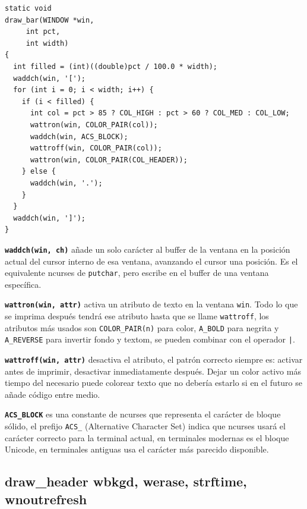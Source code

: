 \documentclass[12pt,letterpaper]{article}
\begin{document}
\begin{lstlisting}[style=modernc, caption={\texttt{ui.c} draw\_bar()}]
static void
draw_bar(WINDOW *win,
	 int pct,
	 int width)
{
  int filled = (int)((double)pct / 100.0 * width);
  waddch(win, '[');
  for (int i = 0; i < width; i++) {
    if (i < filled) {
      int col = pct > 85 ? COL_HIGH : pct > 60 ? COL_MED : COL_LOW;
      wattron(win, COLOR_PAIR(col));
      waddch(win, ACS_BLOCK);
      wattroff(win, COLOR_PAIR(col));
      wattron(win, COLOR_PAIR(COL_HEADER));
    } else {
      waddch(win, '.');
    }
  }
  waddch(win, ']');
}
\end{lstlisting}

\textbf{\texttt{waddch(win, ch)}} añade un solo carácter al buffer de la ventana en la posición actual del
cursor interno de esa ventana, avanzando el cursor una posición. Es el equivalente ncurses de \texttt{putchar},
pero escribe en el buffer de una ventana específica.

\medskip

\textbf{\texttt{wattron(win, attr)}} activa un atributo de texto en la ventana \texttt{win}. Todo lo que se
imprima después tendrá ese atributo hasta que se llame \texttt{wattroff}, los atributos más usados son
\texttt{COLOR\_PAIR(n)} para color, \texttt{A\_BOLD} para negrita y \texttt{A\_REVERSE} para invertir
fondo y textom, se pueden combinar con el operador \texttt{|}.

\medskip

\textbf{\texttt{wattroff(win, attr)}} desactiva el atributo, el patrón correcto siempre es: activar antes de
imprimir, desactivar inmediatamente después. Dejar un color activo más tiempo del necesario puede colorear texto
que no debería estarlo si en el futuro se añade código entre medio.

\medskip

\textbf{\texttt{ACS\_BLOCK}} es una constante de ncurses que representa el carácter de bloque sólido, el
prefijo \texttt{ACS\_} (Alternative Character Set) indica que ncurses usará el carácter correcto para la
terminal actual, en terminales modernas es el bloque Unicode, en terminales antiguas usa el carácter más
parecido disponible.

\subsection*{draw\_header wbkgd, werase, strftime, wnoutrefresh}
\end{document}
